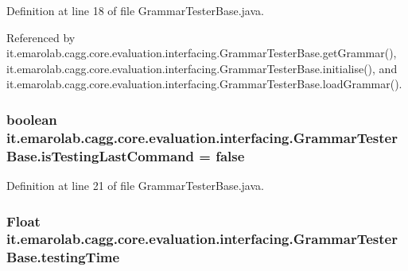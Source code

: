 Definition at line 18 of file Grammar\-Tester\-Base.\-java.



Referenced by it.\-emarolab.\-cagg.\-core.\-evaluation.\-interfacing.\-Grammar\-Tester\-Base.\-get\-Grammar(), it.\-emarolab.\-cagg.\-core.\-evaluation.\-interfacing.\-Grammar\-Tester\-Base.\-initialise(), and it.\-emarolab.\-cagg.\-core.\-evaluation.\-interfacing.\-Grammar\-Tester\-Base.\-load\-Grammar().

\hypertarget{classit_1_1emarolab_1_1cagg_1_1core_1_1evaluation_1_1interfacing_1_1GrammarTesterBase_ad1a8c5550fc3e8dd84d1d2360b85e624}{
\subsubsection[{is\-Testing\-Last\-Command}]{\setlength{\rightskip}{0pt plus 5cm}boolean it.\-emarolab.\-cagg.\-core.\-evaluation.\-interfacing.\-Grammar\-Tester\-Base.\-is\-Testing\-Last\-Command = false\hspace{0.3cm}{\ttfamily [private]}}}\label{classit_1_1emarolab_1_1cagg_1_1core_1_1evaluation_1_1interfacing_1_1GrammarTesterBase_ad1a8c5550fc3e8dd84d1d2360b85e624}


Definition at line 21 of file Grammar\-Tester\-Base.\-java.

\hypertarget{classit_1_1emarolab_1_1cagg_1_1core_1_1evaluation_1_1interfacing_1_1GrammarTesterBase_a2ed2bbc3a9d77263932880d044abe9dc}{
\subsubsection[{testing\-Time}]{\setlength{\rightskip}{0pt plus 5cm}Float it.\-emarolab.\-cagg.\-core.\-evaluation.\-interfacing.\-Grammar\-Tester\-Base.\-testing\-Time\hspace{0.3cm}{\ttfamily [private]}}}\label{classit_1_1emarolab_1_1cagg_1_1core_1_1evaluation_1_1interfacing_1_1GrammarTesterBase_a2ed2bbc3a9d77263932880d044abe9dc}


